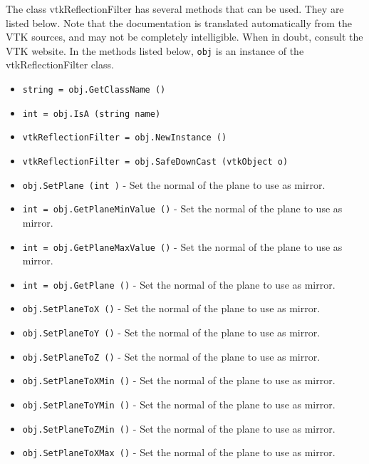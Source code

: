 The class vtkReflectionFilter has several methods that can be used.
  They are listed below.
Note that the documentation is translated automatically from the VTK sources,
and may not be completely intelligible.  When in doubt, consult the VTK website.
In the methods listed below, \verb|obj| is an instance of the vtkReflectionFilter class.
\begin{itemize}
\item  \verb|string = obj.GetClassName ()|

\item  \verb|int = obj.IsA (string name)|

\item  \verb|vtkReflectionFilter = obj.NewInstance ()|

\item  \verb|vtkReflectionFilter = obj.SafeDownCast (vtkObject o)|

\item  \verb|obj.SetPlane (int )| -  Set the normal of the plane to use as mirror.

\item  \verb|int = obj.GetPlaneMinValue ()| -  Set the normal of the plane to use as mirror.

\item  \verb|int = obj.GetPlaneMaxValue ()| -  Set the normal of the plane to use as mirror.

\item  \verb|int = obj.GetPlane ()| -  Set the normal of the plane to use as mirror.

\item  \verb|obj.SetPlaneToX ()| -  Set the normal of the plane to use as mirror.

\item  \verb|obj.SetPlaneToY ()| -  Set the normal of the plane to use as mirror.

\item  \verb|obj.SetPlaneToZ ()| -  Set the normal of the plane to use as mirror.

\item  \verb|obj.SetPlaneToXMin ()| -  Set the normal of the plane to use as mirror.

\item  \verb|obj.SetPlaneToYMin ()| -  Set the normal of the plane to use as mirror.

\item  \verb|obj.SetPlaneToZMin ()| -  Set the normal of the plane to use as mirror.

\item  \verb|obj.SetPlaneToXMax ()| -  Set the normal of the plane to use as mirror.


\end{itemize}
